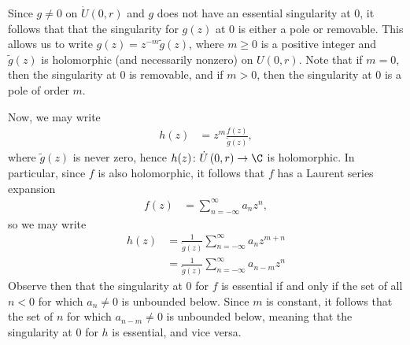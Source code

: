 \documentclass[10pt]{mypackage}
\begin{document}
\begin{solution}
  Since $g\neq 0$ on $\dot{U}\left( 0,r \right)$ and $g$ does not have an essential singularity at $0$, it follows that that the singularity for $g(z)$ at $0$ is either a pole or removable. This allows us to write $g(z) = z^{-m} \widetilde{g}(z)$, where $m \geq 0$ is a positive integer and $\widetilde{g}(z)$ is holomorphic (and necessarily nonzero) on $U\left( 0,r \right)$. Note that if $m = 0$, then the singularity at $0$ is removable, and if $m > 0$, then the singularity at $0$ is a pole of order $m$.\newline

  Now, we may write
  \begin{align*}
    h(z) &= z^{m}\frac{f(z)}{\widetilde{g}(z)},
  \end{align*}
  where $ \widetilde{g}(z) $ is never zero, hence $h(z)\colon \dot{U}\left( 0,r \right)\rightarrow \C$ is holomorphic. In particular, since $f$ is also holomorphic, it follows that $f$ has a Laurent series expansion
  \begin{align*}
    f(z) &= \sum_{n=-\infty}^{\infty} a_n z^{n},
  \end{align*}
  so we may write
  \begin{align*}
    h(z) &= \frac{1}{\widetilde{g}(z)} \sum_{n=-\infty}^{\infty} a_nz^{m+n}\\
         &= \frac{1}{\widetilde{g}(z)} \sum_{n=-\infty}^{\infty} a_{n-m}z^{n}
  \end{align*}
  Observe then that the singularity at $0$ for $f$ is essential if and only if the set of all $n < 0$ for which $a_{n}\neq 0$ is unbounded below. Since $m$ is constant, it follows that the set of $n$ for which $a_{n-m}\neq 0$ is unbounded below, meaning that the singularity at $0$ for $h$ is essential, and vice versa.
\end{solution}
\end{document}
